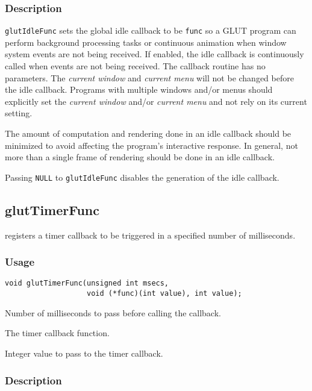 \subsubsection*{Description}

{\tt glutIdleFunc} sets the global idle callback to be {\tt func}
so a GLUT program
can perform background processing tasks or continuous animation when
window system events are not being received.  If enabled, the idle
callback is continuously called when events are not being
received.  The callback routine has no parameters.  The {\em current
window} and {\em current menu} will not be changed before the
idle callback.  Programs with multiple windows and/or menus should
explicitly set the {\em current window} and/or {\em current menu}
and not rely on its current setting.

The amount of computation and rendering done in an idle callback
should be minimized to avoid affecting the program's interactive
response.  In general, not more than a single frame of rendering
should be done in an idle callback.

Passing {\tt NULL} to {\tt glutIdleFunc}
disables the generation of the idle callback.

\subsection{glutTimerFunc}

 registers a timer callback to be triggered
in a specified number of milliseconds.

\subsubsection*{Usage}
\begin{verbatim}
void glutTimerFunc(unsigned int msecs,
                   void (*func)(int value), int value);
\end{verbatim}
\begin{description}
\itemsep 0in
\item[{\tt msecs}]
Number of milliseconds to pass before calling the callback.
\item[{\tt func}]
The timer callback function.
\item[{\tt value}]
Integer value to pass to the timer callback.
\end{description}

\subsubsection*{Description}


